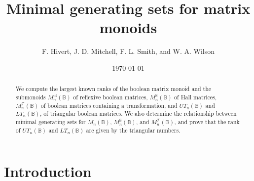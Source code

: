 \documentclass[11pt]{article}
\title{Minimal generating sets for matrix monoids}
\author{F. Hivert, J. D. Mitchell, F. L. Smith, and W. A. Wilson}
\date{\today}
\numberwithin{equation}{section}
\newcommand{\B}{\mathbb{B}}
\newcommand{\Bn}{M_n(\B)}
\newcommand{\Refn}{M_n^{\text{id}}(\B)}
\newcommand{\Halln}{M_n^{\text{S}}(\B)}
\newcommand{\MTn}{M_n^{\mathcal{T}}(\B)}
\newcommand{\UTn}{UT_n(\B)}
\newcommand{\LTn}{LT_n(\B)}
\begin{document}
\maketitle

\begin{abstract}
  We compute the largest known ranks of the boolean matrix monoid and the
  submonoids $\Refn$ of reflexive boolean matrices, $\Halln$ of Hall matrices,
  $\MTn$ of boolean matrices containing a transformation, and $\UTn$ and $\LTn$,
  of triangular boolean matrices. We also determine the relationship between
  minimal generating sets for $\Bn$, $\Halln$, and $\MTn$, and prove that the
  rank of $\UTn$ and $\LTn$ are given by the triangular numbers.
\end{abstract}

\section{Introduction}


\end{document}
